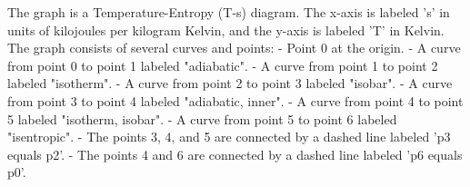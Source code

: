 The graph is a Temperature-Entropy (T-s) diagram. The x-axis is labeled 's' in units of kilojoules per kilogram Kelvin, and the y-axis is labeled 'T' in Kelvin. The graph consists of several curves and points:
- Point 0 at the origin.
- A curve from point 0 to point 1 labeled "adiabatic".
- A curve from point 1 to point 2 labeled "isotherm".
- A curve from point 2 to point 3 labeled "isobar".
- A curve from point 3 to point 4 labeled "adiabatic, inner".
- A curve from point 4 to point 5 labeled "isotherm, isobar".
- A curve from point 5 to point 6 labeled "isentropic".
- The points 3, 4, and 5 are connected by a dashed line labeled 'p3 equals p2'.
- The points 4 and 6 are connected by a dashed line labeled 'p6 equals p0'.